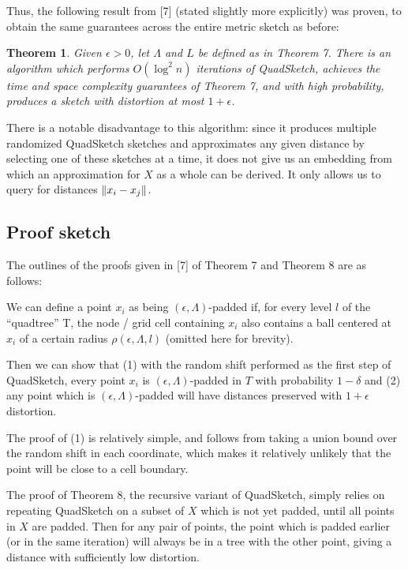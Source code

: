 \documentclass{article}
\newtheorem{theorem}{Theorem}
\begin{document}
Thus, the following result from [7] (stated slightly more explicitly) was
proven, to obtain the same guarantees across the entire metric sketch as before:

\begin{theorem}
  Given $\epsilon > 0$, let $\Lambda$ and $L$ be defined as in Theorem 7. There is an
  algorithm which performs $O(\log^2 n)$ iterations of QuadSketch, achieves the
  time and space complexity guarantees of Theorem 7, and with high probability,
  produces a sketch with distortion at most $1 + \epsilon$.
\end{theorem}

There is a notable disadvantage to this algorithm: since it produces multiple
randomized QuadSketch sketches and approximates any given distance by selecting
one of these sketches at a time, it does not give us an embedding from which an
approximation for $X$ as a whole can be derived. It only allows us to query for
distances $\norm{x_i - x_j}$.

\subsection{Proof sketch}

The outlines of the proofs given in [7] of Theorem 7 and Theorem 8 are as
follows:

We can define a point $x_i$ as being $(\epsilon, \Lambda)$-padded if, for every level $l$ of
the ``quadtree'' T, the node / grid cell containing $x_i$ also contains a ball
centered at $x_i$ of a certain radius $\rho(\epsilon,\Lambda,l)$ (omitted here for brevity).

Then we can show that (1) with the random shift performed as the first step of
QuadSketch, every point $x_i$ is $(\epsilon, \Lambda)$-padded in $T$ with probability $1 - \delta$
and (2) any point which is $(\epsilon, \Lambda)$-padded will have distances preserved with $1
+ \epsilon$ distortion.

The proof of (1) is relatively simple, and follows from taking a union bound
over the random shift in each coordinate, which makes it relatively unlikely
that the point will be close to a cell boundary.

The proof of Theorem 8, the recursive variant of QuadSketch, simply relies on
repeating QuadSketch on a subset of $X$ which is not yet padded, until all
points in $X$ are padded. Then for any pair of points, the point which is padded
earlier (or in the same iteration) will always be in a tree with the other
point, giving a distance with sufficiently low distortion.
\end{document}

